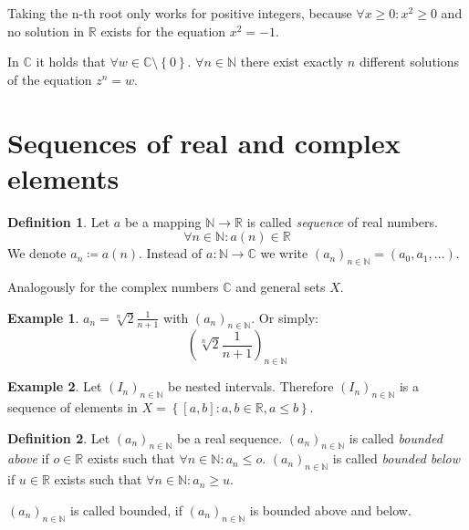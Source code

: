 \documentclass[a4paper,landscape,twocolumn]{article}
\theoremstyle{definition}
\newtheorem{defi}{Definition}
\newtheorem{ex}{Example}
\newcommand\set[1]{\left\{#1\right\}}
\begin{document}
Taking the n-th root only works for positive integers, because $\forall x \geq 0: x^2 \geq 0$
and no solution in $\mathbb R$ exists for the equation $x^2 = -1$.

In $\mathbb C$ it holds that $\forall w \in \mathbb C \setminus \set{0}$.
$\forall n \in \mathbb N$ there exist exactly $n$ different solutions of the equation $z^n = w$.

\section{Sequences of real and complex elements}
\begin{defi}
  Let $a$ be a mapping $\mathbb N \to \mathbb R$ is called \emph{sequence} of real numbers.
  \[ \forall n \in \mathbb N: a(n) \in \mathbb R \]
  We denote $a_n \coloneqq a(n)$.
  Instead of $a: \mathbb N \to \mathbb C$ we write $(a_n)_{n \in \mathbb N} = (a_0, a_1, \ldots)$.

  Analogously for the complex numbers $\mathbb C$ and general sets $X$.
\end{defi}

\begin{ex}
  $a_n = \sqrt[n]{2} \frac{1}{n + 1}$ with $(a_n)_{n \in \mathbb N}$. Or simply:
  \[ \left(\sqrt[n]{2}\frac{1}{n + 1}\right)_{n \in \mathbb N} \]
\end{ex}

\begin{ex}
  Let $(I_n)_{n \in \mathbb N}$ be nested intervals.
  Therefore $(I_n)_{n \in \mathbb N}$ is a sequence of elements in $X = \set{[a,b]: a,b \in \mathbb R, a \leq b}$.
\end{ex}

\begin{defi}
  Let $(a_n)_{n \in \mathbb N}$ be a real sequence.
  $(a_n)_{n \in \mathbb N}$ is called \emph{bounded above} if $o \in \mathbb R$ exists such that $\forall n \in \mathbb N: a_n \leq o$.
  $(a_n)_{n \in \mathbb N}$ is called \emph{bounded below} if $u \in \mathbb R$ exists such that $\forall n \in \mathbb N: a_n \geq u$.

  $(a_n)_{n \in \mathbb N}$ is called bounded, if $(a_n)_{n \in \mathbb N}$ is bounded above and below.
\end{defi}
\end{document}
